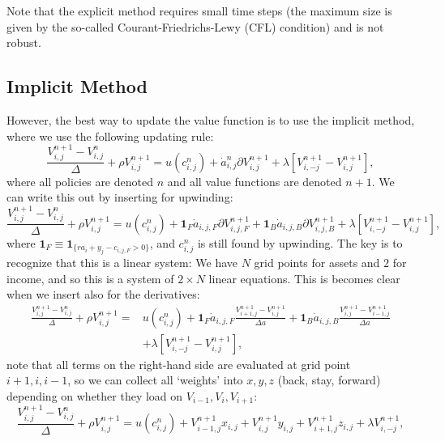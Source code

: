 \documentclass[12pt]{article}
\DeclareMathOperator{\1}{\mathbbm{1}}
\begin{document}
Note that the explicit method requires small time steps (the maximum size is given by the so-called Courant-Friedrichs-Lewy (CFL) condition) and is not robust.

\subsection{Implicit Method}\label{sec:implicitmethod}
However, the best way to update the value function is to use the implicit method, where we use the following updating rule:
\begin{equation}
\frac{V^{n+1}_{i,j} - V^n_{i,j}}\Delta + \rho V^{n+1}_{i,j} =u(c^n_{i,j}) + \dot a^n_{i,j} \partial V^{n+1}_{i,j} + \lambda [V^{n+1}_{i,-j} - V^{n+1}_{i,j}],
\end{equation}
where all policies are denoted $n$ and all value functions are denoted $n+1$. We can write this out by inserting for upwinding:
\begin{equation}
\frac{V^{n+1}_{i,j} - V^n_{i,j}}{\Delta} +  \rho V^{n+1}_{i,j} =u(c^n_{i,j}) + \mathbf{1}_F\dot a_{i,j,F} \partial V^{n+1}_{i,j,F} + \mathbf{1}_B \dot a_{i,j,B} \partial V^{n+1}_{i,j,B} + \lambda [V^{n+1}_{i,-j} - V^{n+1}_{i,j}],
\end{equation}
where $\mathbf{1}_F \equiv \mathbf{1}_{\{ra_i + y_j - c_{i,j,F}>0\}}$, and  $c^n_{i,j}$ is still found by upwinding. The key is to recognize that this is a linear system: We have $N$ grid points for assets and $2$ for income, and so this is a system of $2\times N$ linear equations. This is becomes clear when we insert also for the derivatives:
\begin{equation}
\begin{split}
\frac{V^{n+1}_{i,j} - V^n_{i,j}}{\Delta} +  \rho V^{n+1}_{i,j} =&u(c^n_{i,j}) + \mathbf{1}_F\dot a_{i,j,F} \frac{V^{n+1}_{i+1,j} - V^{n+1}_{i,j}}{\Delta a } + \mathbf{1}_B \dot a_{i,j,B} \frac{V^{n+1}_{i,j} - V^{n+1}_{i-1,j}}{\Delta a}  \\
 & + \lambda [V^{n+1}_{i,-j} - V^{n+1}_{i,j}],
\end{split}
\end{equation}
note that all terms on the right-hand side are evaluated at grid point $i+1,i,i-1$, so we can collect all `weights' into $x,y,z$ (back, stay, forward)  depending on whether they load on $V_{i-1},V_i,V_{i+1}$:
\begin{equation}\label{eq:systemeq}
\frac{V^{n+1}_{i,j} - V^n_{i,j}}{\Delta} +  \rho V^{n+1}_{i,j} =u(c^n_{i,j}) + V^{n+1}_{i-1,j}x_{i,j} + V^{n+1}_{i,j}y_{i,j} + V^{n+1}_{i+1,j}z_{i,j}
 + \lambda V^{n+1}_{i,-j},
\end{equation}
\end{document}
